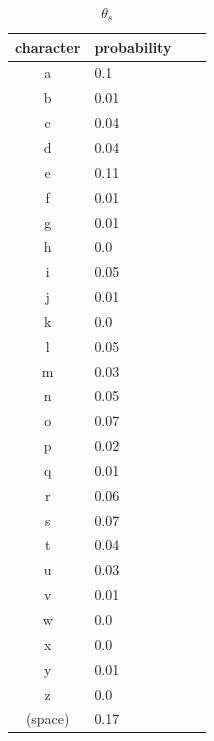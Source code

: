 \documentclass[a4paper]{article}
\theoremstyle{definition}
\newenvironment{soln}{
	\leavevmode\color{blue}\ignorespaces
}{}
\begin{document}
\begin{soln}
\begin{table}[h]
\begin{minipage}[t]{.45\textwidth}
  \end{minipage}
  \hfill
  \begin{minipage}[t]{.45\textwidth}
    \begin{center}
       \caption{$\theta_s$}
      \begin{tabular}{clll}
   \hline
   character & probability \\
   \hline \hline
a & 0.1 \\
b & 0.01 \\
c & 0.04 \\
d & 0.04 \\
e & 0.11 \\
f & 0.01 \\
g & 0.01 \\
h & 0.0 \\
i & 0.05 \\
j & 0.01 \\
k & 0.0 \\
l & 0.05 \\
m & 0.03 \\
n & 0.05 \\
o & 0.07 \\
p & 0.02 \\
q & 0.01 \\
r & 0.06 \\
s & 0.07 \\
t & 0.04 \\
u & 0.03 \\
v & 0.01 \\
w & 0.0 \\
x & 0.0 \\
y & 0.01 \\
z & 0.0 \\
(space)  & 0.17 \\
   \hline
      \end{tabular}
    \end{center}
  \end{minipage}
\end{table}
	
	\end{soln}
	\clearpage
\end{document}
